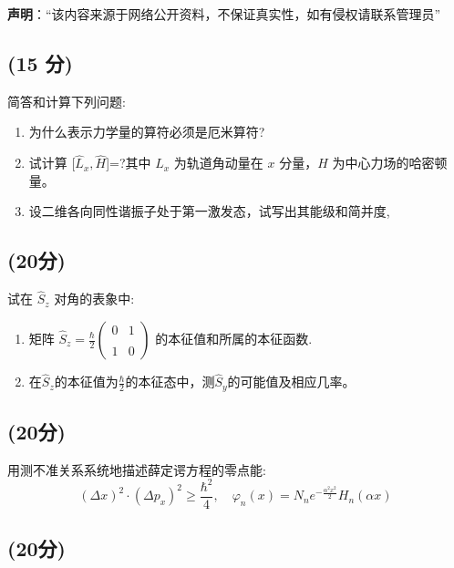 
\textbf{声明}：“该内容来源于网络公开资料，不保证真实性，如有侵权请联系管理员”

\subsection{(15 分)}
简答和计算下列问题:
\begin{enumerate}
    \item 为什么表示力学量的算符必须是厄米算符?
    \item 试计算 [$\hat{L}_x ,\hat{H}$]=?其中 $\hat{L}_x$ 为轨道角动量在 $x$ 分量，$\hat{H}$ 为中心力场的哈密顿量。
    \item 设二维各向同性谐振子处于第一激发态，试写出其能级和简并度,
\end{enumerate}
\subsection{(20分)}
试在 $\hat{S}_z$ 对角的表象中:
\begin{enumerate}
    \item 矩阵 $\hat{S}_z = \frac{\hbar}{2}\begin{pmatrix} 0 & 1 \\\\ 1 & 0 \end{pmatrix}$ 的本征值和所属的本征函数.
    \item 在$\hat{S}_z$的本征值为$\frac{\hbar}{2}$的本征态中，测$\hat{S}_y$的可能值及相应几率。
\end{enumerate}
\subsection{(20分)}
用测不准关系系统地描述薛定谔方程的零点能:
$$\left( \Delta x \right)^2 \cdot \left( \Delta p_x \right)^2 \geq \frac{\hbar^2}{4}, \quad
\varphi_n(x) = N_n e^{-\frac{\alpha^2 x^2}{2}} H_n(\alpha x)~$$
\subsection{(20分)}

